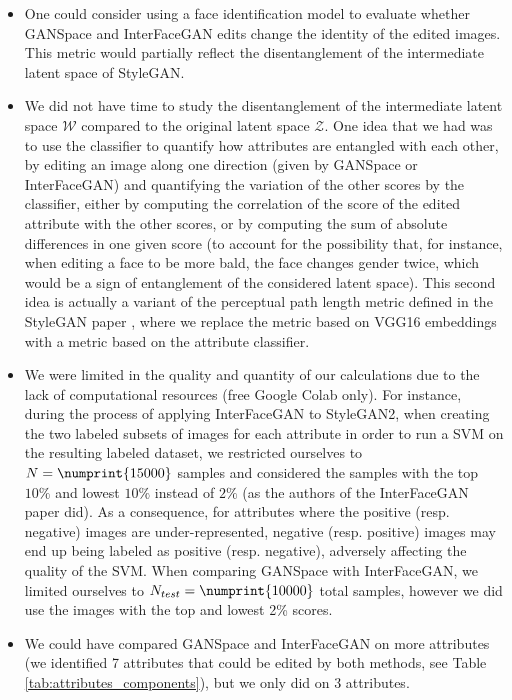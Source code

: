 \documentclass[a4paper]{article}
\begin{document}
\begin{itemize}
    \item One could consider using a face identification model to evaluate whether GANSpace and InterFaceGAN edits change the identity of the edited images. This metric would partially reflect the disentanglement of the intermediate latent space of StyleGAN.
    \item We did not have time to study the disentanglement of the intermediate latent space $\mathcal{W}$ compared to the original latent space $\mathcal{Z}$. One idea that we had was to use the classifier to quantify how attributes are entangled with each other, by editing an image along one direction (given by GANSpace or InterFaceGAN) and quantifying the variation of the other scores by the classifier, either by computing the correlation of the score of the edited attribute with the other scores, or by computing the sum of absolute differences in one given score (to account for the possibility that, for instance, when editing a face to be more bald, the face changes gender twice, which would be a sign of entanglement of the considered latent space). This second idea is actually a variant of the perceptual path length metric defined in the StyleGAN paper \cite{karras2019stylebased}, where we replace the metric based on VGG16 embeddings with a metric based on the attribute classifier.
    \item We were limited in the quality and quantity of our calculations due to the lack of computational resources (free Google Colab only). For instance, during the process of applying InterFaceGAN to StyleGAN2, when creating the two labeled subsets of images for each attribute in order to run a SVM on the resulting labeled dataset, we restricted ourselves to $N = \numprint{15000}$ samples and considered the samples with the top $10\%$ and lowest $10\%$ instead of $2\%$ (as the authors of the InterFaceGAN paper \cite{shen2020interfacegan} did). As a consequence, for attributes where the positive (resp. negative) images are under-represented, negative (resp. positive) images may end up being labeled as positive (resp. negative), adversely affecting the quality of the SVM. When comparing GANSpace with InterFaceGAN, we limited ourselves to $N_{test} = \numprint{10000}$ total samples, however we did use the images with the top and lowest 2\% scores.
    \item We could have compared GANSpace and InterFaceGAN on more attributes (we identified 7 attributes that could be edited by both methods, see Table \ref{tab:attributes_components}), but we only did on 3 attributes.

\end{itemize}
\end{document}
